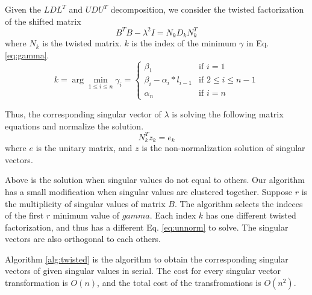 Given the $LDL^T$ and $UDU^T$ decomposition, we consider the twisted factorization of the shifted matrix
\begin{equation}
B^T B - \lambda^2 I = N_k D_k N_k^T
\end{equation}
where $N_k$ is the twisted matrix.
$k$ is the index of the minimum $\gamma$ in Eq. \ref{eq:gamma}.
\begin{equation}
\label{eq:gamma}
k = \arg \min_{1\le i \le n} \gamma_{i} =
\begin{cases}
\beta_1 & \text{if } i=1 \\
\beta_i - \alpha_i * l_{i-1} & \text{if } 2\le i\le n-1\\
\alpha_n & \text{if } i=n
\end{cases}
\end{equation}

Thus, the corresponding singular vector of $\lambda$ is solving the following matrix equations and normalize the solution.
\begin{equation}
\label{eq:unnorm}
N_k^T z_k = e_k
\end{equation}
where $e$ is the unitary matrix, and $z$ is the non-normalization solution of singular vectors.

Above is the solution when singular values do not equal to others.
Our algorithm has a small modification when singular values are clustered together.
Suppose $r$ is the multiplicity of singular values of matrix $B$. 
The algorithm selects the indeces of the first $r$ minimum value of $gamma$.
Each index $k$ has one different twisted factorization, and thus has a different Eq. \ref{eq:unnorm} to solve.
The singular vectors are also orthogonal to each others\cite{09NLAAtwisted}.

Algorithm \ref{alg:twisted} is the algorithm to obtain the corresponding singular vectors of given singular values in serial.
The cost for every singular vector transformation is $O(n)$, and the total cost of the transfromations is $O(n^2)$.

